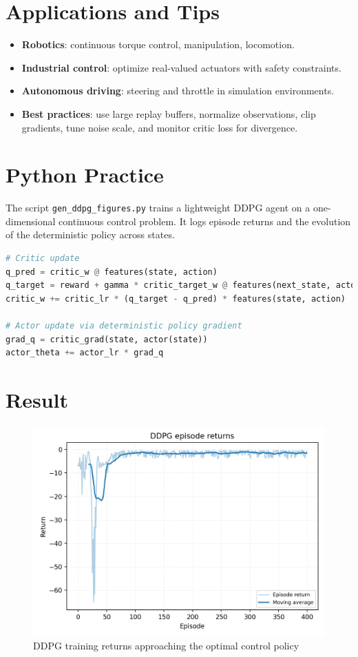﻿\documentclass[12pt]{article}
\begin{document}
\section{Applications and Tips}
\begin{itemize}
  \item \textbf{Robotics}: continuous torque control, manipulation, locomotion.
  \item \textbf{Industrial control}: optimize real-valued actuators with safety constraints.
  \item \textbf{Autonomous driving}: steering and throttle in simulation environments.
  \item \textbf{Best practices}: use large replay buffers, normalize observations, clip gradients, tune noise scale, and monitor critic loss for divergence.
\end{itemize}

\section{Python Practice}
The script \texttt{gen\_ddpg\_figures.py} trains a lightweight DDPG agent on a one-dimensional continuous control problem. It logs episode returns and the evolution of the deterministic policy across states.
\begin{lstlisting}[language=Python,caption={Excerpt from gen_ddpg_figures.py}]
# Critic update
q_pred = critic_w @ features(state, action)
q_target = reward + gamma * critic_target_w @ features(next_state, actor_target(next_state))
critic_w += critic_lr * (q_target - q_pred) * features(state, action)

# Actor update via deterministic policy gradient
grad_q = critic_grad(state, actor(state))
actor_theta += actor_lr * grad_q
\end{lstlisting}

\section{Result}
\begin{figure}[H]
  \centering
  \includegraphics[width=0.8\linewidth]{ddpg_returns.png}
  \caption{DDPG training returns approaching the optimal control policy}
  \label{fig:ddpg_returns}
\end{figure}
\end{document}
